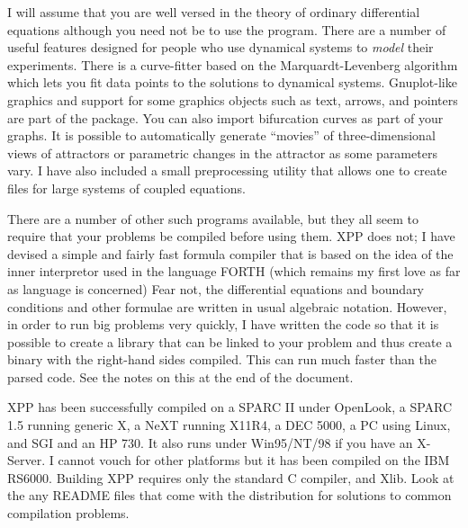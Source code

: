 \documentclass{article}
\begin{document}
I will assume that you are well versed in the theory of ordinary differential
 equations although you need not be to use the program.
There are a number of useful features designed for people who use
dynamical systems to {\em model} their experiments.  There is a
curve-fitter based on the Marquardt-Levenberg algorithm which lets you
fit data points to the solutions to dynamical systems.
Gnuplot-like graphics and
support for some graphics objects such as text, arrows, and
pointers are part of the package. You can also import bifurcation
curves as part of your graphs.
 It is possible to automatically generate ``movies'' of
three-dimensional views of attractors or parametric changes in the
attractor as some parameters vary.    I have
also included a small preprocessing utility that allows one to create
files for large systems of coupled equations.

There are a number of other such programs available, but they all seem to
 require that your problems be compiled before using them.  XPP does not;
 I have devised a simple and fairly fast formula compiler that is based
 on the idea of the inner interpretor used in the language FORTH (which
 remains my first love as far as language is concerned)  Fear not, the
 differential equations and boundary conditions and other formulae are
 written in usual algebraic notation.  However, in order to run big
problems very quickly, I have written the code so that it is possible
to create a library that can be linked to your problem and thus create
a binary with the right-hand sides compiled.  This can run much faster
than the parsed code.  See the notes on this at the end of the
document.




XPP has been successfully compiled on a SPARC II under OpenLook, a SPARC
 1.5 running generic X, a NeXT running X11R4, a DEC 5000, a PC using
Linux, and SGI and an HP 730. It also runs under Win95/NT/98 if you
have an X-Server.
  I cannot vouch for other platforms but it has been compiled on the
 IBM RS6000. Building XPP requires only the standard C compiler,
 and Xlib.  Look at the any README files that come with the
distribution for solutions to common compilation problems.
\end{document}
